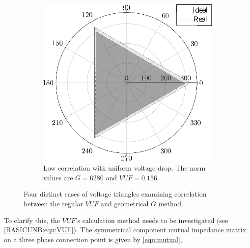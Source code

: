 \begin{figure}
\begin{subfigure}[b]{0.48\textwidth}
                    \includegraphics[width=\textwidth]{Unblance_EPS_Pics/EPS_images/circle.eps}
                    \caption{\centering Low correlation with uniform voltage drop. The norm values are $G=6280$ and $VUF=0.156$.}
                    \label{fig:cases_D}
                \end{subfigure}


                \caption{Four distinct cases of voltage triangles examining correlation between the regular $VUF$ and geometrical $G$ method.}\label{fig:cases}
            \end{figure}

To clarify this, the $VUF$'s calculation method needs to be investigated (see \ref{BASICUNB:equ:VUF}). The symmetrical component mutual impedance matrix on a three phase connection point is given by \ref{equ:mutual},

